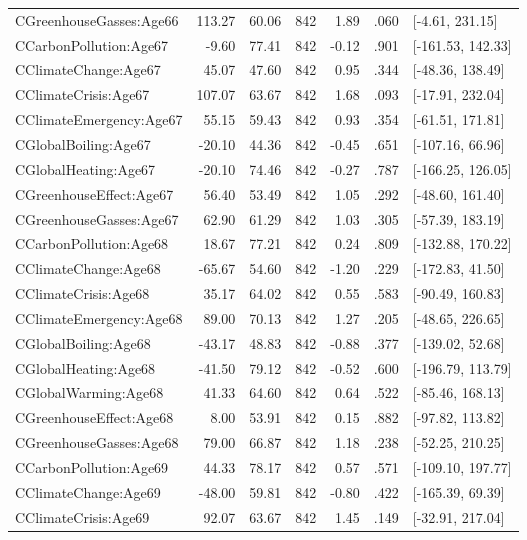 \begin{table}[ht]
\begin{tabular}{lrrrrrl}
  CGreenhouseGasses:Age66 & 113.27 & 60.06 & 842 & 1.89 & .060 & [-4.61, 231.15] \\ 
  CCarbonPollution:Age67 & -9.60 & 77.41 & 842 & -0.12 & .901 & [-161.53, 142.33] \\ 
  CClimateChange:Age67 & 45.07 & 47.60 & 842 & 0.95 & .344 & [-48.36, 138.49] \\ 
  CClimateCrisis:Age67 & 107.07 & 63.67 & 842 & 1.68 & .093 & [-17.91, 232.04] \\ 
  CClimateEmergency:Age67 & 55.15 & 59.43 & 842 & 0.93 & .354 & [-61.51, 171.81] \\ 
  CGlobalBoiling:Age67 & -20.10 & 44.36 & 842 & -0.45 & .651 & [-107.16, 66.96] \\ 
  CGlobalHeating:Age67 & -20.10 & 74.46 & 842 & -0.27 & .787 & [-166.25, 126.05] \\ 
  CGreenhouseEffect:Age67 & 56.40 & 53.49 & 842 & 1.05 & .292 & [-48.60, 161.40] \\ 
  CGreenhouseGasses:Age67 & 62.90 & 61.29 & 842 & 1.03 & .305 & [-57.39, 183.19] \\ 
  CCarbonPollution:Age68 & 18.67 & 77.21 & 842 & 0.24 & .809 & [-132.88, 170.22] \\ 
  CClimateChange:Age68 & -65.67 & 54.60 & 842 & -1.20 & .229 & [-172.83, 41.50] \\ 
  CClimateCrisis:Age68 & 35.17 & 64.02 & 842 & 0.55 & .583 & [-90.49, 160.83] \\ 
  CClimateEmergency:Age68 & 89.00 & 70.13 & 842 & 1.27 & .205 & [-48.65, 226.65] \\ 
  CGlobalBoiling:Age68 & -43.17 & 48.83 & 842 & -0.88 & .377 & [-139.02, 52.68] \\ 
  CGlobalHeating:Age68 & -41.50 & 79.12 & 842 & -0.52 & .600 & [-196.79, 113.79] \\ 
  CGlobalWarming:Age68 & 41.33 & 64.60 & 842 & 0.64 & .522 & [-85.46, 168.13] \\ 
  CGreenhouseEffect:Age68 & 8.00 & 53.91 & 842 & 0.15 & .882 & [-97.82, 113.82] \\ 
  CGreenhouseGasses:Age68 & 79.00 & 66.87 & 842 & 1.18 & .238 & [-52.25, 210.25] \\ 
  CCarbonPollution:Age69 & 44.33 & 78.17 & 842 & 0.57 & .571 & [-109.10, 197.77] \\ 
  CClimateChange:Age69 & -48.00 & 59.81 & 842 & -0.80 & .422 & [-165.39, 69.39] \\ 
  CClimateCrisis:Age69 & 92.07 & 63.67 & 842 & 1.45 & .149 & [-32.91, 217.04] \\ 

\end{tabular}
\end{table}
